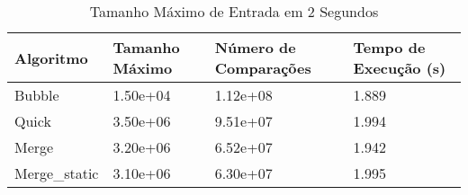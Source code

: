 \begin{table}
\caption{Tamanho Máximo de Entrada em 2 Segundos}
\label{tab:tamanho_maximo}
\begin{tabular}{llll}
\toprule
Algoritmo & Tamanho Máximo & Número de Comparações & Tempo de Execução (s) \\
\midrule
Bubble & 1.50e+04 & 1.12e+08 & 1.889 \\
Quick & 3.50e+06 & 9.51e+07 & 1.994 \\
Merge & 3.20e+06 & 6.52e+07 & 1.942 \\
Merge_static & 3.10e+06 & 6.30e+07 & 1.995 \\
\bottomrule
\end{tabular}
\end{table}
